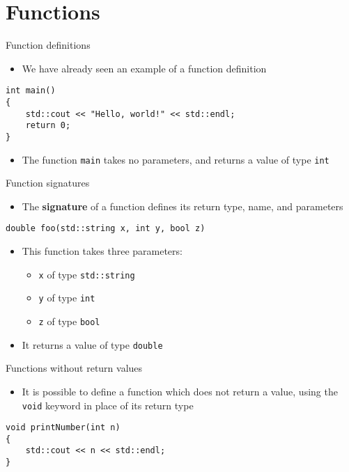 \part{Functions}
\frame{\partpage}

\begin{frame}[fragile]{Function definitions}
    \begin{itemize}
        \item We have already seen an example of a function definition
    \end{itemize}
    \begin{lstlisting}
int main()
{
    std::cout << "Hello, world!" << std::endl;
    return 0;
}
    \end{lstlisting}
    \begin{itemize}
        \item The function \lstinline{main} takes no parameters, and returns a value of type \lstinline{int}
    \end{itemize}
\end{frame}

\begin{frame}[fragile]{Function signatures}
    \begin{itemize}
        \item The \textbf{signature} of a function defines its return type, name, and parameters
    \end{itemize}
    \begin{lstlisting}
double foo(std::string x, int y, bool z)
    \end{lstlisting}
    \pause
    \begin{itemize}
        \item This function takes three parameters: \pause
        \begin{itemize}
            \item \lstinline{x} of type \lstinline{std::string} \pause
            \item \lstinline{y} of type \lstinline{int} \pause
            \item \lstinline{z} of type \lstinline{bool} \pause
        \end{itemize}
        \item It returns a value of type \lstinline{double}
    \end{itemize}
\end{frame}

\begin{frame}[fragile]{Functions without return values}
    \begin{itemize}
        \item It is possible to define a function which does not return a value, using the \lstinline{void} keyword
        in place of its return type
    \end{itemize}
    \pause
    \begin{lstlisting}
void printNumber(int n)
{
    std::cout << n << std::endl;
}
    \end{lstlisting}
\end{frame}

